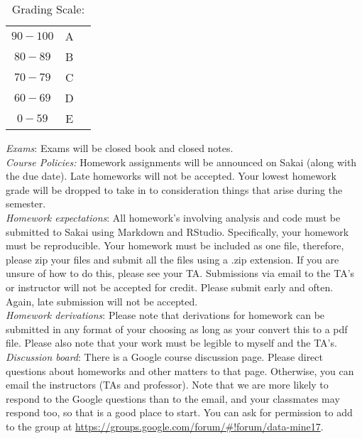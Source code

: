 \documentclass[11pt]{article}
\begin{document}
\begin{table}[ht]
\caption{Grading Scale:}
\begin{center}
\begin{tabular}{ccc}
$90-100$ &A\\
$80-89$ & B\\
$70-79$ & C\\
$60-69$ & D\\
$0-59$ &  E\\
\end{tabular}
\end{center}
\label{default}
\end{table}%

\emph{Exams}: Exams will be closed book and closed notes.\\






\emph{Course Policies:} 
Homework assignments will be announced on Sakai (along with the due date). Late homeworks will not be accepted. Your lowest homework grade will be dropped to take in to consideration things that arise during the semester. \\

\emph{Homework expectations}: All homework's involving analysis and code must be submitted to Sakai using Markdown and RStudio. Specifically, your homework must be reproducible. Your homework must be included as one file, therefore, please zip your files and submit all the files using a .zip extension. If you are unsure of how to do this, please see your TA. Submissions via email to the TA's or instructor will not be accepted for credit. Please submit early and often. Again, late submission will not be accepted. \\

\emph{Homework derivations}: Please note that derivations for homework can be submitted in any format of your choosing as long as your convert this to a pdf file. Please also note that your work must be legible to myself and the TA's. \\


\emph{Discussion board}:
There is a Google course discussion page. Please direct questions about homeworks and other matters to that page. Otherwise, you can email the instructors (TAs and professor). Note that we are more likely to respond to the Google questions than to the email, and your classmates may respond too, so that is a good place to start. You can ask for permission to add to the group at \url{https://groups.google.com/forum/#!forum/data-mine17}.\\
\end{document}
